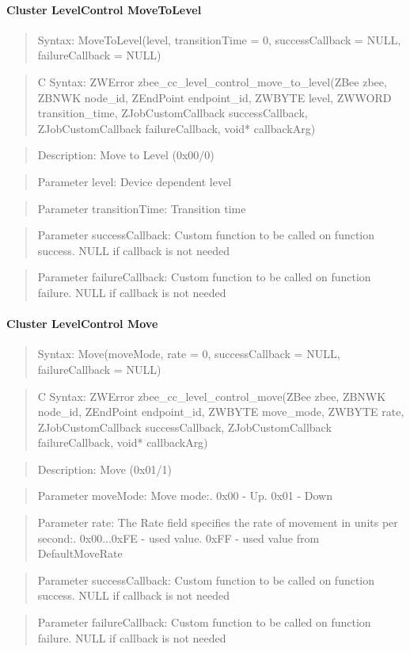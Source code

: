 \paragraph{Cluster LevelControl MoveToLevel}
\begin{quote}Syntax: MoveToLevel(level, transitionTime = 0, successCallback = NULL, failureCallback = NULL)\end{quote}
\begin{quote}C Syntax: ZWError zbee\_cc\_level\_control\_move\_to\_level(ZBee zbee, ZBNWK node\_id, ZEndPoint endpoint\_id, ZWBYTE level, ZWWORD transition\_time, ZJobCustomCallback successCallback, ZJobCustomCallback failureCallback, void* callbackArg)\end{quote}
\begin{quote}Description: Move to Level (0x00/0)\end{quote}
\begin{quote}Parameter level: Device dependent level\end{quote}
\begin{quote}Parameter transitionTime: Transition time\end{quote}
\begin{quote}Parameter successCallback: Custom function to be called on function success. NULL if callback is not needed\end{quote}
\begin{quote}Parameter failureCallback: Custom function to be called on function failure. NULL if callback is not needed\end{quote}


\paragraph{Cluster LevelControl Move}
\begin{quote}Syntax: Move(moveMode, rate = 0, successCallback = NULL, failureCallback = NULL)\end{quote}
\begin{quote}C Syntax: ZWError zbee\_cc\_level\_control\_move(ZBee zbee, ZBNWK node\_id, ZEndPoint endpoint\_id, ZWBYTE move\_mode, ZWBYTE rate, ZJobCustomCallback successCallback, ZJobCustomCallback failureCallback, void* callbackArg)\end{quote}
\begin{quote}Description: Move (0x01/1)\end{quote}
\begin{quote}Parameter moveMode: Move mode:. 0x00 - Up. 0x01 - Down\end{quote}
\begin{quote}Parameter rate: The Rate field specifies the rate of movement in units per second:. 0x00...0xFE - used value. 0xFF        - used value from DefaultMoveRate\end{quote}
\begin{quote}Parameter successCallback: Custom function to be called on function success. NULL if callback is not needed\end{quote}
\begin{quote}Parameter failureCallback: Custom function to be called on function failure. NULL if callback is not needed\end{quote}


